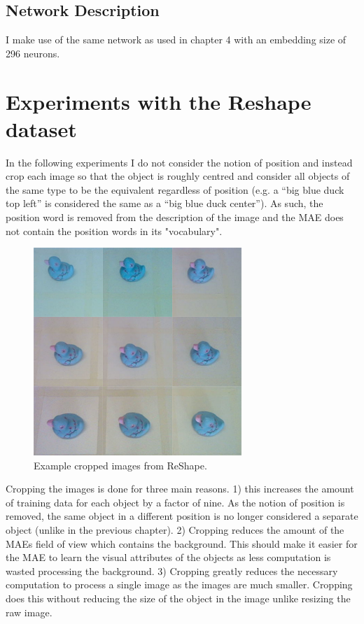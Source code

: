 \subsection{Network Description}
I make use of the same network as used in chapter 4 with an embedding size of 296 neurons. 

\section{Experiments with the Reshape dataset}
In the following experiments I do not consider the notion of position and instead crop each image so that the object is roughly centred and consider all objects of the same type to be the equivalent regardless of position (e.g. a ``big blue duck top left'' is considered the same as a ``big blue duck center''). As such, the position word is removed from the description of the image and the MAE does not contain the position words in its "vocabulary".

\begin{figure}[h]
    \centering
    \includegraphics[width=0.7\textwidth]{Figs/chapter6/ReShapeCrop.png}
    \caption{Example cropped images from ReShape.}
    \label{fig:ReShapeCrop}
\end{figure}

Cropping the images is done for three main reasons. 1) this increases the amount of training data for each object by a factor of nine. As the notion of position is removed, the same object in a different position is no longer considered a separate object (unlike in the previous chapter). 2) Cropping reduces the amount of the MAEs field of view which contains the background. This should make it easier for the MAE to learn the visual attributes of the objects as less computation is wasted processing the background. 3) Cropping greatly reduces the necessary computation to process a single image as the images are much smaller. Cropping does this without reducing the size of the object in the image unlike resizing the raw image.

